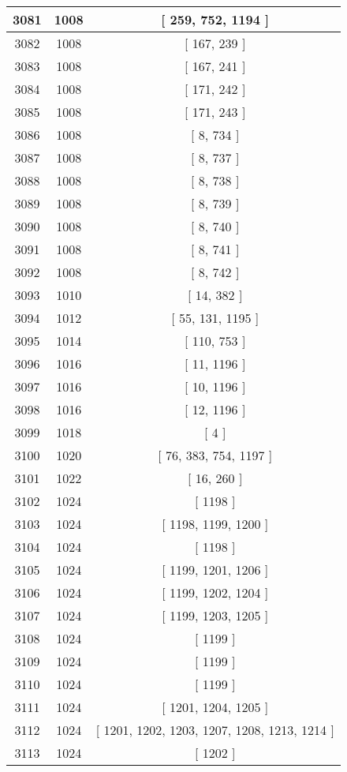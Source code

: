 \begin{center}
\begin{longtable}[H]{|| c c c ||}
\hline
3081 & 1008 & [ 259, 752, 1194 ] \\ 
\hline
3082 & 1008 & [ 167, 239 ] \\ 
\hline
3083 & 1008 & [ 167, 241 ] \\ 
\hline
3084 & 1008 & [ 171, 242 ] \\ 
\hline
3085 & 1008 & [ 171, 243 ] \\ 
\hline
3086 & 1008 & [ 8, 734 ] \\ 
\hline
3087 & 1008 & [ 8, 737 ] \\ 
\hline
3088 & 1008 & [ 8, 738 ] \\ 
\hline
3089 & 1008 & [ 8, 739 ] \\ 
\hline
3090 & 1008 & [ 8, 740 ] \\ 
\hline
3091 & 1008 & [ 8, 741 ] \\ 
\hline
3092 & 1008 & [ 8, 742 ] \\ 
\hline
3093 & 1010 & [ 14, 382 ] \\ 
\hline
3094 & 1012 & [ 55, 131, 1195 ] \\ 
\hline
3095 & 1014 & [ 110, 753 ] \\ 
\hline
3096 & 1016 & [ 11, 1196 ] \\ 
\hline
3097 & 1016 & [ 10, 1196 ] \\ 
\hline
3098 & 1016 & [ 12, 1196 ] \\ 
\hline
3099 & 1018 & [ 4 ] \\ 
\hline
3100 & 1020 & [ 76, 383, 754, 1197 ] \\ 
\hline
3101 & 1022 & [ 16, 260 ] \\ 
\hline
3102 & 1024 & [ 1198 ] \\ 
\hline
3103 & 1024 & [ 1198, 1199, 1200 ] \\ 
\hline
3104 & 1024 & [ 1198 ] \\ 
\hline
3105 & 1024 & [ 1199, 1201, 1206 ] \\ 
\hline
3106 & 1024 & [ 1199, 1202, 1204 ] \\ 
\hline
3107 & 1024 & [ 1199, 1203, 1205 ] \\ 
\hline
3108 & 1024 & [ 1199 ] \\ 
\hline
3109 & 1024 & [ 1199 ] \\ 
\hline
3110 & 1024 & [ 1199 ] \\ 
\hline
3111 & 1024 & [ 1201, 1204, 1205 ] \\ 
\hline
3112 & 1024 & [ 1201, 1202, 1203, 1207, 1208, 1213, 1214 ] \\ 
\hline
3113 & 1024 & [ 1202 ] \\ 

\end{longtable}
\end{center}
